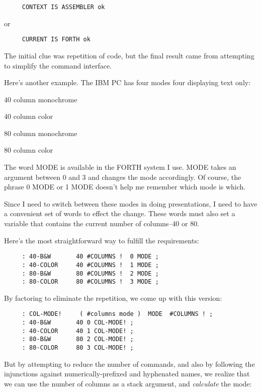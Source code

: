 \documentclass{book}
\begin{document}
\begin{verbatim}
     CONTEXT IS ASSEMBLER ok
\end{verbatim}

\noindent
or

\begin{verbatim}
     CURRENT IS FORTH ok
\end{verbatim}

\noindent
The initial clue was repetition of code, but the final result came from attempting to simplify the command interface.

Here's another example. The IBM PC has four modes four displaying text only:

\bigskip

40 column monochrome

40 column color

80 column monochrome

80 column color

\bigskip

\noindent
The word MODE is available in the FORTH system I use. MODE takes an argument between 0 and 3 and changes the mode accordingly. Of course, the phrase 0 MODE or 1 MODE doesn't help me remember which mode is which.

Since I need to switch between these modes in doing presentations, I need to have a convenient set of words to effect the change. These words must also set a variable that contains the current number of columns--40 or 80.

Here's the most straightforward way to fulfill the requirements:

\begin{verbatim}
     : 40-B&W       40 #COLUMNS !  0 MODE ;
     : 40-COLOR     40 #COLUMNS !  1 MODE ;
     : 80-B&W       80 #COLUMNS !  2 MODE ;
     : 80-COLOR     80 #COLUMNS !  3 MODE ;
\end{verbatim}

\noindent
By factoring to eliminate the repetition, we come up with this version:

\begin{verbatim}
     : COL-MODE!     ( #columns mode )  MODE  #COLUMNS ! ;
     : 40-B&W       40 0 COL-MODE! ;
     : 40-COLOR     40 1 COL-MODE! ;
     : 80-B&W       80 2 COL-MODE! ;
     : 80-COLOR     80 3 COL-MODE! ;
\end{verbatim}

\noindent
But by attempting to reduce the number of commands, and also by following the injunctions against numerically-prefixed and hyphenated names, we realize that we can use the number of columns as a stack argument, and \textit{calculate} the mode:
\end{document}
